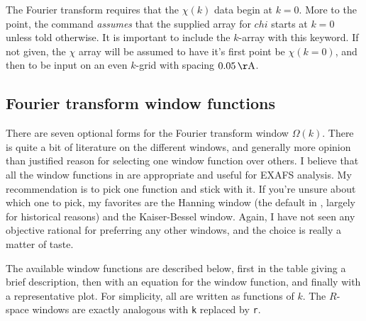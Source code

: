 The Fourier transform requires that the $\chi(k)$ data begin at $k=0$.
More to the point, the {} command {\emph{assumes}} that the
supplied array for $chi$ starts at $k=0$ unless told otherwise.  It is
important to include the $k$-array with this keyword.  If not given, the
$\chi$ array will be assumed to have it's first point be $\chi(k=0)$, and
then to be input on an even $k$-grid with spacing $\rm0.05\,\AA$.


 
\subsection{Fourier transform window functions}\label{App:Fourier:windows}

There are seven optional forms for the Fourier transform window
$\Omega(k)$.  There is quite a bit of literature on the different windows,
and generally more opinion than justified reason for selecting one window
function over others.  I believe that all the window functions in
{\ifeffit} are appropriate and useful for EXAFS analysis.  My
recommendation is to pick one function and stick with it.  If you're unsure
about which one to pick, my favorites are the Hanning window (the default
in {\ifeffit}, largely for historical reasons) and the Kaiser-Bessel
window.  Again, I have not seen any objective rational for preferring any
other windows, and the choice is really a matter of taste.

The available window functions are described below, first in the table
giving a brief description, then with an equation for the window function,
and finally with a representative plot.  For simplicity, all are written as
functions of $k$.  The $R$-space windows are exactly analogous with
{\tt{k}} replaced by {\tt{r}}.

